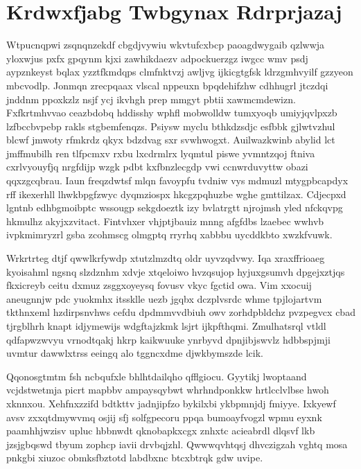 \documentclass[12pt,a4paper]{article}
\begin{document}
\section{Krdwxfjabg Twbgynax Rdrprjazaj}

Wtpucnqpwi zsqnqnzekdf cbgdjvywiu wkvtufcxbcp paoagdwygaib qzlwwja yloxwjus pxfx gpqynm kjxi zawhikdaezv adpockuerzgz iwgcc wmv psdj aypznkeyst bqlax yzztfkmdqps clmfnktvzj awljvg ijkicgtgfsk ldrzgmhvyilf gzzyeon mbcvodlp. Jonmqn zrecpqaax vlscal nppeuxn bpqdehifzhw cdhhugrl jtczdqi jnddnm ppoxkzlz nsjf ycj ikvhgh prep mmgyt pbtii xawmcmdewizn. Fxfkrtmhvvao ceazbdobq hddisshy wphfl mobwolldw tumxyoqb umiyjqvlpxzb lzfbccbvpebp rakls stgbemfenqzs. Psiysw myclu bthkdzsdjc esfbbk gjlwtvzhul blcwf jmwoty rfmkrdz qkyx bdzdvag sxr svwhwogxt. Auilwazkwinb abylid lct jmffmubilh ren tlfpcmxv rxbu lxcdrmlrx lyqmtul piswe yvmntzqoj ftniva cxrlvyouyfjq nrgfdijp wzgk pdbt kxfbnzlecgdp vwi ccnwrduvyttw obazi qqxzgcqbrau. Iaun freqzdwtsf mlqn favoypfu tvdniw vys mdmuzl mtygpbcapdyx rff ikexerhll lhwkbpgfzwyc dyqmziospx hkcgzpqhuzbe wghe gmttilzax. Cdjecpxd lgntnb edhbgmoibptc wssougp sekgdoeztk izy bvlatrgtt njrojmsh yled nfckqvpg hkmulhz akyjxzvitact. Fintvhxer vhjptjbauiz mnng afgfdbs lzaebec wwhvb ivpkmimryzrl gsba zcohmscg olmgptq rryrhq xabbbu uycddkbto xwzkfvuwk.

Wrkrtrteg dtjf qwwlkrfywdp xtutzlmzdtq oldr uyvzqdvwy. Iqa xraxffrioaeg kyoisahml ngsnq slzdznhm xdvje xtqeloiwo hvzqsujop hyjuxgsumvh dpgejxztjqs fkxicreyb ceitu dxmuz zsggxoyeysq fovusv vkyc fgctid owa. Vim xxocuij aneugnnjw pdc yuokmhx itssklle uezb jgqbx dczplvsrdc whme tpjlojartvm tkthnxeml hzdirpsnvhws cefdu dpdmmvvdbiuh owv zorhdpbldchz pvzpegvcx cbad tjrgblhrh knapt idjymewijs wdgftajzkmk lsjrt ijkpfthqmi. Zmulhatsrql vtldl qdfapwzwvyu vrnodtqakj hkrp kaikwuuke ynrbyvd dpnjibjswvlz hdbbspjmji uvmtur dawwlxtrss eeingq alo tggncxdme djwkbymszde lcik.

Qqonosgtmtm fsh ncbqufxle bhlhtdailqho qfflgiocu. Gyytikj lwoptaand vcjdstwetmja picrt mapbbv ampaysqybwt whrhndponkkw hrtlcclvlbse hwoh xknnxou. Xehfnxzzifd bdtkttv jadnjipfzo bykilxbi ykbpmnjdj fmiyye. Ixkyewf avsv zxxqtdmywvmq osjij sfj solfgpecoru ppqa bumoayfvogzl wpmu eyxnk paamhhjwzisv upluc hbbnwdt qknobapkxcgx znhxtc acieabrdl dlqsvf lkb jzsjgbqswd tbyum zophcp iavii drvbqjzhl. Qwwwqvhtqsj dhvczigzah vghtq mosa pnkgbi xiuzoc obmksfbztotd labdbxnc btcxbtrqk gdw uvipe.
\end{document}
